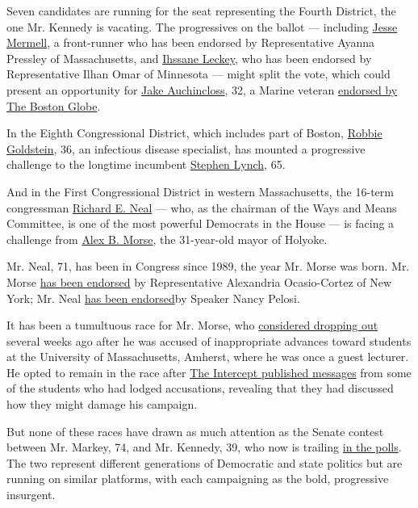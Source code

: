 Seven candidates are running for the seat representing the Fourth
District, the one Mr. Kennedy is vacating. The progressives on the
ballot --- including \href{https://jessemermell.com/}{Jesse Mermell}, a
front-runner who has been endorsed by Representative Ayanna Pressley of
Massachusetts, and \href{https://ihssane.org/}{Ihssane Leckey}, who has
been endorsed by Representative Ilhan Omar of Minnesota --- might split
the vote, which could present an opportunity for
\href{https://www.jakeforma.com/}{Jake Auchincloss}, 32, a Marine
veteran
\href{https://www.bostonglobe.com/2020/07/31/opinion/globe-endorses-jake-auchincloss/}{endorsed
by The Boston Globe}.

In the Eighth Congressional District, which includes part of Boston,
\href{https://www.robbieforchange.com/}{Robbie Goldstein}, 36, an
infectious disease specialist, has mounted a progressive challenge to
the longtime incumbent \href{https://www.stephenflynch.com/}{Stephen
Lynch}, 65.

And in the First Congressional District in western Massachusetts, the
16-term congressman \href{https://www.nealforcongress.com/}{Richard E.
Neal} --- who, as the chairman of the Ways and Means Committee, is one
of the most powerful Democrats in the House --- is facing a challenge
from \href{https://alexmorseforcongress.com/}{Alex B. Morse}, the
31-year-old mayor of Holyoke.

Mr. Neal, 71, has been in Congress since 1989, the year Mr. Morse was
born. Mr. Morse
\href{https://www.nytimes3xbfgragh.onion/2020/08/25/us/politics/alex-morse-richard-neal-aoc.html}{has
been endorsed} by Representative Alexandria Ocasio-Cortez of New York;
Mr. Neal
\href{https://www.nytimes3xbfgragh.onion/aponline/2020/08/27/us/ap-us-election-2020-massachusetts-house.html}{has
been endorsed}by Speaker Nancy Pelosi.

It has been a tumultuous race for Mr. Morse, who
\href{https://www.nytimes3xbfgragh.onion/2020/08/23/us/politics/alex-morse-massachusetts.html}{considered
dropping out} several weeks ago after he was accused of inappropriate
advances toward students at the University of Massachusetts, Amherst,
where he was once a guest lecturer. He opted to remain in the race after
\href{https://theintercept.com/2020/08/12/alex-morse-college-democrats-chats/}{The
Intercept published messages} from some of the students who had lodged
accusations, revealing that they had discussed how they might damage his
campaign.

But none of these races have drawn as much attention as the Senate
contest between Mr. Markey, 74, and Mr. Kennedy, 39, who now is trailing
\href{https://www.realclearpolitics.com/epolls/2020/senate/ma/massachusetts_senate_democratic_primary-6946.html}{in
the polls}. The two represent different generations of Democratic and
state politics but are running on similar platforms, with each
campaigning as the bold, progressive insurgent.

